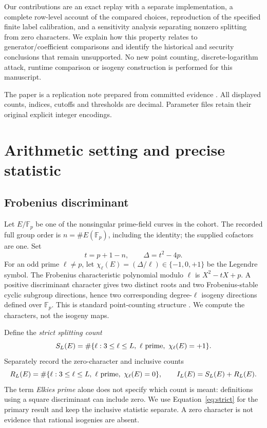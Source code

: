 \documentclass[11pt]{article}
\newcommand{\F}{\mathbb F}
\begin{document}
Our contributions are an exact replay with a separate implementation,
a complete row-level account of the compared choices, reproduction of the
specified finite label calibration, and a sensitivity analysis separating
nonzero splitting from zero characters. We explain how this property relates
to generator/coefficient comparisons and identify the historical and
security conclusions that remain unsupported. No new point counting,
discrete-logarithm attack, runtime comparison or isogeny construction is
performed for this manuscript.

The paper is a replication note prepared from committed evidence
\cite{strictdata}. All displayed counts, indices, cutoffs and thresholds are
decimal. Parameter files retain their original explicit integer encodings.

\section{Arithmetic setting and precise statistic}
\subsection{Frobenius discriminant}
Let $E/\F_p$ be one of the nonsingular prime-field curves in the cohort.
The recorded full group order is $n=\#E(\F_p)$, including the identity;
the supplied cofactors are one. Set
\begin{equation}
 t=p+1-n,\qquad \Delta=t^2-4p.
 \label{eq:discriminant}
\end{equation}
For an odd prime $\ell\ne p$, let
$\chi_\ell(E)=(\Delta/\ell)\in\{-1,0,+1\}$ be the Legendre symbol.
The Frobenius characteristic polynomial modulo $\ell$ is
$X^2-tX+p$. A positive discriminant character gives two distinct roots and
two Frobenius-stable cyclic subgroup directions, hence two corresponding
degree-$\ell$ isogeny directions defined over $\F_p$.
This is standard point-counting structure
\cite{shparlinskiSutherland}. We compute the characters, not the isogeny maps.

Define the \emph{strict splitting count}
\begin{equation}
 S_L(E)=\#\{\ell:3\leq\ell\leq L,\ \ell\ {\rm prime},\
                                  \chi_\ell(E)=+1\}.
 \label{eq:strict}
\end{equation}
Separately record the zero-character and inclusive counts
\begin{equation}
 R_L(E)=\#\{\ell:3\leq\ell\leq L,\ \ell\ {\rm prime},\
               \chi_\ell(E)=0\},\qquad I_L(E)=S_L(E)+R_L(E).
 \label{eq:inclusive}
\end{equation}
The term \emph{Elkies prime} alone does not specify which count is meant:
definitions using a square discriminant can include zero. We use
Equation~\eqref{eq:strict} for the primary result and keep the inclusive
statistic separate. A zero character is not evidence that rational
isogenies are absent.
\end{document}
